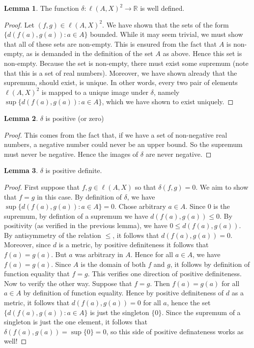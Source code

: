 \documentclass[11pt]{article}
\newcommand{\R}{\mathbb{R}}
\theoremstyle{definition}
\newtheorem{lemma}{Lemma}
\begin{document}
\begin{lemma}
The function $\delta:\ell(A,X)^2\to \R$ is well defined.
\end{lemma}

\begin{proof}
Let $(f,g)\in \ell(A,X)^2$. We have shown that the sets of the form $\{d(f(a), g(a)): a\in A\}$ bounded. While it may seem trivial, we must show that all of these sets are non-empty. This is ensured from the fact that $A$ is non-empty, as is demanded in the definition of the set $A$ as above. Hence this set is non-empty. Because the set is non-empty, there must exist some supremum (note that this is a set of real numbers). Moreover, we have shown already that the supremum, should exist, is unique. In other words, every two pair of elements $\ell(A,X)^2$ is mapped to a unique image under $\delta$, namely $\sup\{d(f(a), g(a)):a\in A\}$, which we have shown to exist uniquely.
\end{proof}


\begin{lemma}
$\delta$ is positive (or zero)
\end{lemma}
\begin{proof}
This comes from the fact that, if we have a set of non-negative real numbers, a negative number could never be an upper bound. So the supremum must never be negative. Hence the images of $\delta$ are never negative.
\end{proof}

\begin{lemma}
$\delta$ is positive definite. 
\end{lemma}
\begin{proof}
First suppose that $f,g\in \ell(A,X)$ so that $\delta(f,g) = 0$. We aim to show that $f = g$ in this case.  By definition of $\delta$, we have $\sup\{d(f(a), g(a)) : a\in A\} = 0$.  Chose arbitrary $a\in A$. Since $0$ is the supremum, by defintion of a supremum we have $d(f(a), g(a)) \le 0$. By positivity (as verified in the previous lemma), we have $0 \le d(f(a), g(a))$. By antisymmetry of the relation $\le$, it follows that $ d(f(a), g(a)) = 0 $. Moreover, since $d$ is a metric, by positive definiteness it follows that $f(a) = g(a)$. But $a$ was arbitrary in $A$. Hence for all $a\in A$, we have $f(a) = g(a)$. Since $A$ is the domain of both $f$ and $g$, it follows by definition of function equality that $f = g$. This verifies one direction of positive definiteness. \\

Now to verify the other way. Suppose that $f = g$. Then $f(a) = g(a)$ for all $a\in A$ by definition of function equality. Hence by positive definiteness of $d$ as a metric, it follows that $d(f(a),g(a)) = 0$ for all $a$, hence the set $\{d(f(a), g(a)): a\in A\}$ is just the singleton $\{0\}$. Since the supremum of a singleton is just the one element, it follows that $\delta(f(a), g(a)) = \sup\{0\} = 0 $, so this side of positive definateness works as well!
\end{proof}
\end{document}
